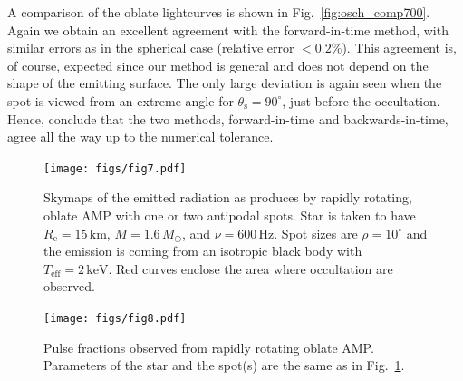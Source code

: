\documentclass{aa}
\newcommand{\refe}[1]{#1}
\newcommand{\refedel}[1]{}
\newcommand{\Msun}{\ensuremath{M_{\odot}}}
\begin{document}
A comparison of the oblate lightcurves is shown in Fig.~\ref{fig:osch_comp700}.
Again we obtain an excellent agreement with the forward-in-time method, with similar errors as in the spherical case (relative error $< 0.2\%$).
This agreement is, of course, expected since our method is general and does not depend on the shape of the emitting surface.
The only large deviation is again seen when the spot is viewed from an extreme angle for $\theta_{\mathrm{s}} = 90^{\circ}$, just before the \refedel{eclipse}\refe{occultation}.
\refe{Hence, conclude that the two methods, forward-in-time and backwards-in-time, agree all the way up to the numerical tolerance.}



\begin{figure}
\texttt{[image: figs/fig7.pdf]}
\caption{\label{fig:skymap}
    Skymaps of the emitted radiation as produces by rapidly rotating, oblate AMP with one or two antipodal spots.
    Star is taken to have $R_{\mathrm{e}} = 15\,\mathrm{km}$, $M=1.6\,\Msun$, and $\nu = 600\,\mathrm{Hz}$.
    Spot sizes are $\rho = 10^{\circ}$ and the emission is coming from an isotropic black body with $T_{\mathrm{eff}} = 2\,\mathrm{keV}$.
    Red curves enclose the area where \refedel{eclipses}\refe{occultation} are observed.
  }
\end{figure}

\begin{figure}
\texttt{[image: figs/fig8.pdf]}
\caption{\label{fig:pulsefracs}
    Pulse fractions observed from rapidly rotating oblate AMP.
    Parameters of the star and the spot(s) are the same as in Fig.~\ref{fig:skymap}.
  }
\end{figure}
\end{document}
